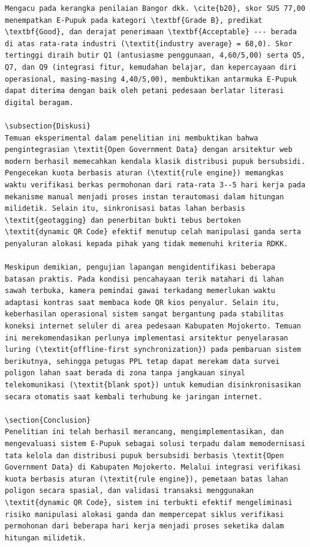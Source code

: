 \documentclass[conference]{IEEEtran}
\begin{document}
\begin{lstlisting}
Mengacu pada kerangka penilaian Bangor dkk. \cite{b20}, skor SUS 77,00 menempatkan E-Pupuk pada kategori \textbf{Grade B}, predikat \textbf{Good}, dan derajat penerimaan \textbf{Acceptable} --- berada di atas rata-rata industri (\textit{industry average} = 68,0). Skor tertinggi diraih butir Q1 (antusiasme penggunaan, 4,60/5,00) serta Q5, Q7, dan Q9 (integrasi fitur, kemudahan belajar, dan kepercayaan diri operasional, masing-masing 4,40/5,00), membuktikan antarmuka E-Pupuk dapat diterima dengan baik oleh petani pedesaan berlatar literasi digital beragam.

\subsection{Diskusi}
Temuan eksperimental dalam penelitian ini membuktikan bahwa pengintegrasian \textit{Open Government Data} dengan arsitektur web modern berhasil memecahkan kendala klasik distribusi pupuk bersubsidi. Pengecekan kuota berbasis aturan (\textit{rule engine}) memangkas waktu verifikasi berkas permohonan dari rata-rata 3--5 hari kerja pada mekanisme manual menjadi proses instan terautomasi dalam hitungan milidetik. Selain itu, sinkronisasi batas lahan berbasis \textit{geotagging} dan penerbitan bukti tebus bertoken \textit{dynamic QR Code} efektif menutup celah manipulasi ganda serta penyaluran alokasi kepada pihak yang tidak memenuhi kriteria RDKK.

Meskipun demikian, pengujian lapangan mengidentifikasi beberapa batasan praktis. Pada kondisi pencahayaan terik matahari di lahan sawah terbuka, kamera pemindai gawai terkadang memerlukan waktu adaptasi kontras saat membaca kode QR kios penyalur. Selain itu, keberhasilan operasional sistem sangat bergantung pada stabilitas koneksi internet seluler di area pedesaan Kabupaten Mojokerto. Temuan ini merekomendasikan perlunya implementasi arsitektur penyelarasan luring (\textit{offline-first synchronization}) pada pembaruan sistem berikutnya, sehingga petugas PPL tetap dapat merekam data survei poligon lahan saat berada di zona tanpa jangkauan sinyal telekomunikasi (\textit{blank spot}) untuk kemudian disinkronisasikan secara otomatis saat kembali terhubung ke jaringan internet.

\section{Conclusion}
Penelitian ini telah berhasil merancang, mengimplementasikan, dan mengevaluasi sistem E-Pupuk sebagai solusi terpadu dalam memodernisasi tata kelola dan distribusi pupuk bersubsidi berbasis \textit{Open Government Data} di Kabupaten Mojokerto. Melalui integrasi verifikasi kuota berbasis aturan (\textit{rule engine}), pemetaan batas lahan poligon secara spasial, dan validasi transaksi menggunakan \textit{dynamic QR Code}, sistem ini terbukti efektif mengeliminasi risiko manipulasi alokasi ganda dan mempercepat siklus verifikasi permohonan dari beberapa hari kerja menjadi proses seketika dalam hitungan milidetik.


\end{lstlisting}
\end{document}
